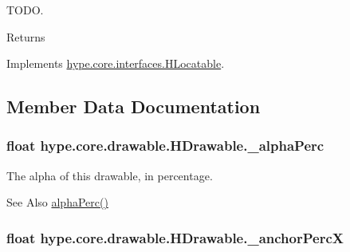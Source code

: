 T\-O\-D\-O. 

\begin{DoxyReturn}{Returns}

\end{DoxyReturn}


Implements \hyperlink{interfacehype_1_1core_1_1interfaces_1_1_h_locatable_a39eb12015a40fe494f789607dec9c484}{hype.\-core.\-interfaces.\-H\-Locatable}.



\subsection{Member Data Documentation}
\hypertarget{classhype_1_1core_1_1drawable_1_1_h_drawable_a7567622bf145f03bc8897e9e399c2051}{
\subsubsection[{\-\_\-alpha\-Perc}]{\setlength{\rightskip}{0pt plus 5cm}float hype.\-core.\-drawable.\-H\-Drawable.\-\_\-alpha\-Perc\hspace{0.3cm}{\ttfamily [protected]}}}\label{classhype_1_1core_1_1drawable_1_1_h_drawable_a7567622bf145f03bc8897e9e399c2051}


The alpha of this drawable, in percentage. 

\begin{DoxySeeAlso}{See Also}
\hyperlink{classhype_1_1core_1_1drawable_1_1_h_drawable_a40489fffc3b4e24a27ed8b1bfa38ca7d}{alpha\-Perc()} 
\end{DoxySeeAlso}
\hypertarget{classhype_1_1core_1_1drawable_1_1_h_drawable_aafd5ea67637b380c4b81ad3e093e8c40}{
\subsubsection[{\-\_\-anchor\-Perc\-X}]{\setlength{\rightskip}{0pt plus 5cm}float hype.\-core.\-drawable.\-H\-Drawable.\-\_\-anchor\-Perc\-X\hspace{0.3cm}{\ttfamily [protected]}}}\label{classhype_1_1core_1_1drawable_1_1_h_drawable_aafd5ea67637b380c4b81ad3e093e8c40}


